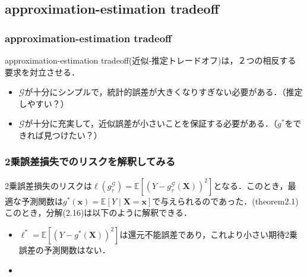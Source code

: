\documentclass[dvipdfmx,cjk]{beamer}
\theoremstyle{example}
\begin{document}
\subsection{approximation-estimation tradeoff}
\begin{frame}
    \frametitle{approximation-estimation tradeoff}
    approximation-estimation tradeoff(近似-推定トレードオフ)は，２つの相反する要求を対立させる．
    \begin{itemize}
        \item $\mathcal{G}$が十分にシンプルで，統計的誤差が大きくなりすぎない必要がある．（推定しやすい？）
        \item $\mathcal{G}$が十分に充実して，近似誤差が小さいことを保証する必要がある．（$g^*$をできれば見つけたい？）
    \end{itemize}
\end{frame}

\begin{frame}
    \frametitle{2乗誤差損失でのリスクを解釈してみる}
    2乗誤差損失のリスクは$\ell(g^\mathcal{G}_\tau)=\mathbb{E}\left[(Y-g^\mathcal{G}_\tau(\boldsymbol{X}))^2\right]$となる．このとき，最適な予測関数は$g^*(\boldsymbol{x})=\mathbb{E}\left[Y\mid \boldsymbol{X}=\boldsymbol{x}\right]$で与えられるのであった．(theorem2.1)\\
    このとき，分解(2.16)は以下のように解釈できる．
    \begin{itemize}
        \item $\ell^*=\mathbb{E}\left[(Y-g^*(\boldsymbol{X}))^2\right]$は還元不能誤差であり，これより小さい期待2乗誤差の予測関数はない．
        \item
    \end{itemize}
\end{frame}
\end{document}
